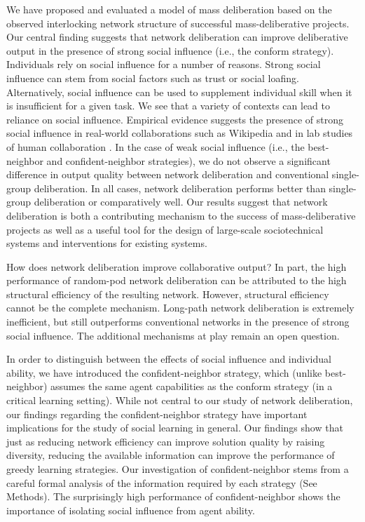 \documentclass[twocolumn,10pt]{article}
\begin{document}
We have proposed and evaluated a model of mass deliberation based on the observed interlocking network structure of successful mass-deliberative projects.
Our central finding suggests that network deliberation can improve deliberative output in the presence of strong social influence (i.e., the conform strategy).
Individuals rely on social influence for a number of reasons.
Strong social influence can stem from social factors such as trust or social loafing.
Alternatively, social influence can be used to supplement individual skill when it is insufficient for a given task.
We see that a variety of contexts can lead to reliance on social influence.
Empirical evidence suggests the presence of strong social influence in real-world collaborations such as Wikipedia \cite{platt_network_2018} and in lab studies of human collaboration \cite{mason_collaborative_2012, barkoczi_social_2016}.
In the case of weak social influence (i.e., the  best-neighbor and confident-neighbor strategies), we do not observe a significant difference in output quality between network deliberation and conventional single-group deliberation. In all cases, network deliberation performs better than single-group deliberation or comparatively well. 
Our results suggest that network deliberation is both a contributing mechanism to the success of mass-deliberative projects as well as a useful tool for the design of large-scale sociotechnical systems and interventions for existing systems.

How does network deliberation improve collaborative output? In part, the high performance of random-pod network deliberation can be attributed to the high structural efficiency of the resulting network. However, structural efficiency cannot be the complete mechanism. Long-path network deliberation is extremely inefficient, but still outperforms conventional networks in the presence of strong social influence. The additional mechanisms at play remain an open question.

In order to distinguish between the effects of social influence and individual ability, we have introduced the confident-neighbor strategy, which (unlike best-neighbor) assumes the same agent capabilities as the conform strategy (in a critical learning setting).
While not central to our study of network deliberation, our findings regarding the 
confident-neighbor strategy have important implications for the study of social learning in general. 
Our findings show that just as reducing network efficiency can improve solution quality by raising diversity, reducing the available information can improve the performance of greedy learning strategies. Our investigation of confident-neighbor stems from a careful formal analysis of the information required by each strategy (See Methods). The surprisingly high performance of confident-neighbor shows the importance of isolating social influence from agent ability.
\end{document}
